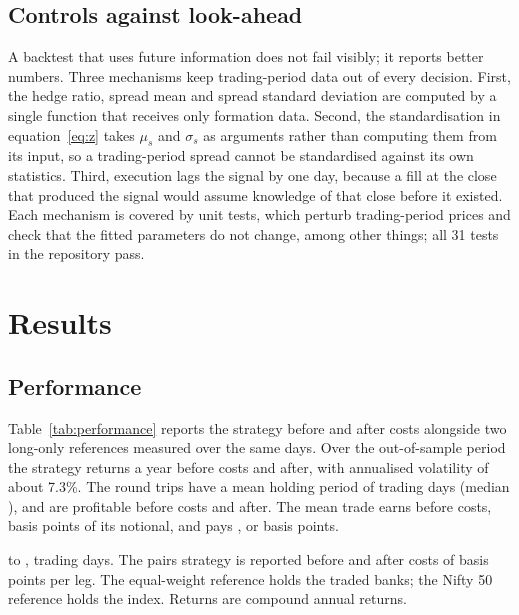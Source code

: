 \documentclass[11pt]{article}
\begin{document}
\subsection{Controls against look-ahead}

A backtest that uses future information does not fail visibly; it reports better
numbers. Three mechanisms keep trading-period data out of every decision. First,
the hedge ratio, spread mean and spread standard deviation are computed by a single
function that receives only formation data. Second, the standardisation in
equation~\eqref{eq:z} takes $\mu_s$ and $\sigma_s$ as arguments rather than
computing them from its input, so a trading-period spread cannot be standardised
against its own statistics. Third, execution lags the signal by one day, because a
fill at the close that produced the signal would assume knowledge of that close
before it existed. Each mechanism is covered by unit tests, which perturb
trading-period prices and check that the fitted parameters do not change, among
other things; all 31 tests in the repository pass.

\section{Results}\label{sec:results}

\subsection{Performance}

Table~\ref{tab:performance} reports the strategy before and after costs alongside
two long-only references measured over the same days. Over the out-of-sample
period the strategy returns \RetG{} a year before costs and \RetN{} after, with
annualised volatility of about 7.3\%. The \NTrades{} round trips have a mean holding
period of \MeanHold{} trading days (median \MedianHold), and \WinGross{} are
profitable before costs and \WinNet{} after. The mean trade earns \rupee\MeanGrossPnL{}
before costs, \MeanGrossBps{} basis points of its notional, and pays
\rupee\MeanCost, or \MeanCostBps{} basis points.

\begin{table}[tbp]
\centering
\caption{Out-of-sample performance}
\label{tab:performance}
\small

\begin{tablenote}
\OOSStart{} to \OOSEnd, \OOSDays{} trading days. The pairs strategy is reported
before and after costs of \BpsLeg{} basis points per leg. The equal-weight reference
holds the \NTraded{} traded banks; the Nifty 50 reference holds the index. Returns
are compound annual returns.
\end{tablenote}
\end{table}
\end{document}
